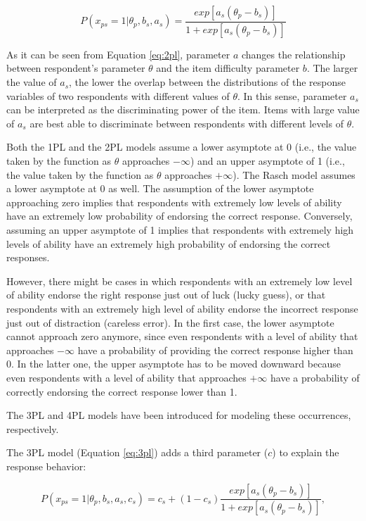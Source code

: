 \documentclass[12pt]{book}
\begin{document}
\begin{equation}\label{eq:2pl}
	P(x_{ps} = 1 | \theta_p, b_s, a_s) = \frac{exp[a_s(\theta_p - b_s)]}{1 + exp[a_s(\theta_p - b_s)]}
\end{equation}

As it can be seen from Equation \ref{eq:2pl}, parameter $a$ changes the relationship between respondent's parameter $\theta$ and the item difficulty parameter $b$. The larger the value of $a_s$, the lower the overlap between the distributions of the response variables of two respondents with different values of $\theta$. In this sense, parameter $a_s$ can be interpreted as the discriminating power of the item. Items with large value of $a_s$ are best able to discriminate between respondents with different levels of $\theta$.

Both the 1PL and the 2PL models assume a lower asymptote at 0 (i.e., the value taken by the function as $\theta$ approaches $- \infty$) and an upper asymptote of 1 (i.e., the value taken by the function as $\theta$ approaches $+ \infty$). The Rasch model assumes a lower asymptote at 0 as well. 
The assumption of the lower asymptote approaching zero implies that respondents with extremely low levels of ability have an extremely low probability of endorsing the correct response. 
Conversely, assuming an upper asymptote of 1 implies that respondents with extremely high levels of ability have an extremely high probability of endorsing the correct responses. 

However, there might be cases in which respondents with an extremely low level of ability endorse the right response just out of luck (lucky guess), or that respondents with an extremely high level of ability endorse the incorrect response just out of distraction (careless error). 
In the first case, the lower asymptote cannot approach zero anymore, since even respondents with a level of ability that approaches $- \infty$ have a probability of providing the correct response higher than 0. 
In the latter one, the upper asymptote has to be moved downward because even respondents with a level of ability that approaches $+ \infty$ have a probability of correctly endorsing the correct response lower than 1. 

The 3PL and 4PL models have been introduced for modeling these occurrences, respectively.

The 3PL model (Equation \ref{eq:3pl}) \cite{lord}  adds a third parameter ($c$) to explain the response behavior: 

\begin{equation}\label{eq:3pl}
		P(x_{ps} = 1 | \theta_p, b_s, a_s, c_s) = c_s + (1-c_s)\frac{exp[a_s(\theta_p - b_s)]}{1 + exp[a_s(\theta_p - b_s)]},
\end{equation}
\end{document}
